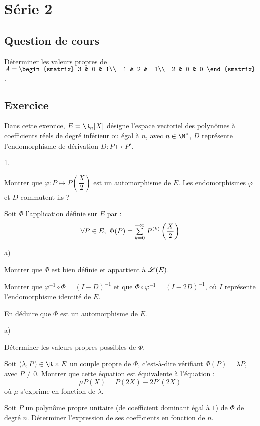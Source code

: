 \documentclass[11pt]{article}%
\begin{document}
\newpage

\section*{Série 2}
\subsection*{Question de cours}
\noindent
Déterminer les valeurs propres de $A=
\begin{smatrix}
 3 & 0 & 1\\
 -1 & 2 & -1\\
 -2 & 0 & 0
\end{smatrix}$.

\subsection*{Exercice} %
\noindent
Dans cette exercice, $E=\R_n[X]$ désigne l'espace vectoriel des 
polynômes à coefficients réels de degré inférieur ou égal à $n$, avec 
$n\in\N^*$, $D$ représente l'endomorphisme de dérivation $D:P\mapsto 
P'$.
\begin{noliste}{1.}
 \item Montrer que $\varphi : P \mapsto P\left(\dfrac{X}{2}\right)$ est 
 un automorphisme de $E$. Les endomorphismes $\varphi$ et $D$ 
 commutent-ils ?
 
 \item Soit $\Phi$ l'application définie sur $E$ par :
 \[
  \forall P\in E, \ \Phi(P) = {\textstyle\sum\limits_{k=0}^{+\infty}}\hspace{.1cm} P^{(k)}\left( 
  \dfrac{X}{2}\right)
 \]
 \begin{noliste}{a)}
  \item Montrer que $\Phi$ est bien définie et appartient à $\mathscr{L}(E)$.
  
  \item Montrer que $\varphi^{-1} \circ \Phi = (I-D)^{-1}$ et que $\Phi 
  \circ \varphi^{-1} = (I-2D)^{-1}$, où $I$ représente l'endomorphisme 
  identité de $E$.
  
  \item En déduire que $\Phi$ est un automorphisme de $E$.
 \end{noliste}
 
 \item 
 \begin{noliste}{a)}
  \item Déterminer les valeurs propres possibles de $\Phi$.
  
  \item Soit $(\lambda, P)\in \R\times E$ un couple propre de $\Phi$, 
  c'est-à-dire vérifiant $\Phi(P)=\lambda P$, avec $P\neq 0$. Montrer 
  que cette équation est équivalente à l'équation :
  \[
   \mu P(X) = P(2X) - 2P'(2X)
  \]
  où $\mu$ s'exprime en fonction de $\lambda$.
  
  \item Soit $P$ un polynôme propre unitaire (\ie de coefficient 
  dominant égal à $1$) de $\Phi$ de degré $n$. Déterminer l'expression 
  de ses coefficients en fonction de $n$.\\
 \end{noliste}
\end{noliste}
\end{document}
